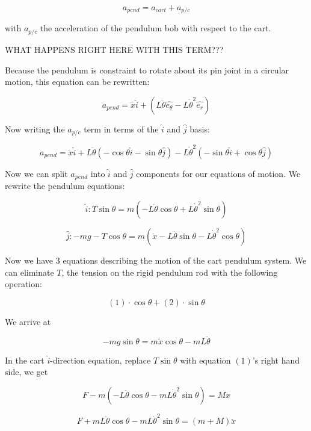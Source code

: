 \documentclass{article}
\begin{document}
$$ a_{pend} = a_{cart} + a_{p/c} $$

with $a_{p/c}$ the acceleration of the pendulum bob with respect to the cart.

WHAT HAPPENS RIGHT HERE WITH THIS TERM???

Because the pendulum is constraint to rotate about its pin joint in a circular motion, this equation can be rewritten:

$$ a_{pend} = \ddot{x}\hat{i} + (L\ddot{\theta}\hat{e_{\theta}} - L\dot{\theta}^2\hat{e_{r}}) $$

Now writing the $a_{p/c}$ term in terms of the $\hat{i}$ and $\hat{j}$ basis:

$$ a_{pend} = \ddot{x}\hat{i} + L\ddot{\theta}(-\cos{\theta}\hat{i} - \sin{\theta}\hat{j}) - L\dot{\theta}^{2}(-\sin{\theta}\hat{i} + \cos{\theta}\hat{j}) $$

Now we can split $a_{pend}$ into $\hat{i}$ and $\hat{j}$ components for our equations of motion. We rewrite the pendulum equations:

\begin{equation}
        \hat{i}: T\sin{\theta} = m(-L\ddot{\theta}\cos{\theta} + L\dot{\theta}^{2}\sin{\theta})
\end{equation}

\begin{equation}
    \hat{j}: -mg -T\cos{\theta} = m(\ddot{x} - L\ddot{\theta}\sin{\theta} - L\dot{\theta}^2\cos{\theta})
\end{equation}

Now we have 3 equations describing the motion of the cart pendulum system. We can eliminate $T$, the tension on the rigid pendulum rod with the following operation:

$$ (1)\cdot\cos{\theta} + (2)\cdot\sin{\theta} $$

We arrive at

\begin{equation}
    -mg\sin{\theta} = m\ddot{x}\cos{\theta} - mL\ddot{\theta}
\end{equation}

In the cart $\hat{i}$-direction equation, replace $T\sin{\theta}$ with equation $(1)$'s right hand side, we get

$$ F - m(-L\ddot{\theta}\cos{\theta} - mL\dot{\theta}^2\sin{\theta}) = M\ddot{x} $$

\begin{equation}
    F + mL\ddot{\theta}\cos{\theta} - mL\dot{\theta}^{2}\sin{\theta} = (m + M)\ddot{x}
\end{equation}
\end{document}
